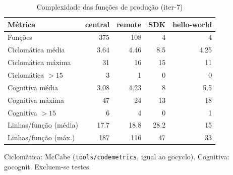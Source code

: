 \begin{table}[htbp]
  \centering\small
  \caption{Complexidade das funções de produção (iter-7)}
  \label{tab:iter-7-complexidade}
  \begin{tabular}{lrrrr}
    \toprule
    Métrica & central & remote & SDK & hello-world \\
    \midrule
    Funções & 375 & 108 & 4 & 4 \\
    Ciclomática média & 3.64 & 4.46 & 8.5 & 4.25 \\
    Ciclomática máxima & 31 & 16 & 15 & 11 \\
    Ciclomática $>15$ & 3 & 1 & 0 & 0 \\
    Cognitiva média & 3.08 & 4.23 & 8 & 5.5 \\
    Cognitiva máxima & 47 & 24 & 13 & 18 \\
    Cognitiva $>15$ & 6 & 4 & 0 & 1 \\
    Linhas/função (média) & 17.7 & 18.8 & 28.2 & 15 \\
    Linhas/função (máx.) & 187 & 116 & 47 & 33 \\
    \bottomrule
  \end{tabular}
  \par\smallskip\footnotesize Ciclomática: McCabe (\texttt{tools/codemetrics}, igual ao gocyclo). Cognitiva: gocognit. Excluem-se testes.
\end{table}
